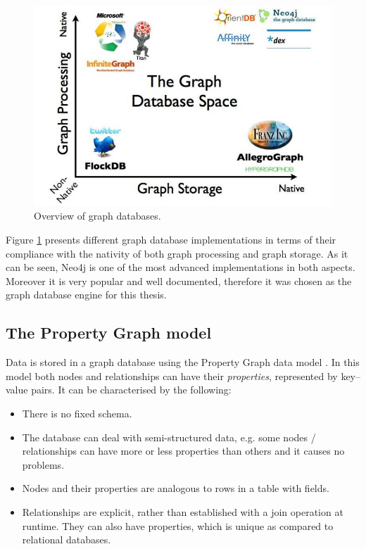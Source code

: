 \documentclass[12pt]{report}
\begin{document}
\begin{figure}[!t]
\centering
\includegraphics[width=\textwidth]{graph_databases_comp.jpg} 
\caption[Overview of graph databases.]{Overview of graph databases.\footnotemark{}}
\label{fig.graph_databases}
\end{figure}

Figure \ref{fig.graph_databases} presents different graph database implementations in terms of their compliance with the nativity of both graph processing and graph storage. As it can be seen, Neo4j is one of the most advanced implementations in both aspects. Moreover it is very popular and well documented, therefore it was chosen as the graph database engine for this thesis.


\subsection{The Property Graph model}

Data is stored in a graph database using the Property Graph data model \cite{learning_neo4j}. In this model both nodes and relationships can have their \textit{properties}, represented by key--value pairs. It can be characterised by the following:
\begin{itemize}
\item There is no fixed schema.
\item The database can deal with semi-structured data, e.g. some nodes / relationships can have more or less properties than others and it causes no problems.
\item Nodes and their properties are analogous to rows in a table with fields.
\item Relationships are explicit, rather than established with a join operation at runtime. They can also have properties, which is unique as compared to relational databases.
\end{itemize}
\end{document}

